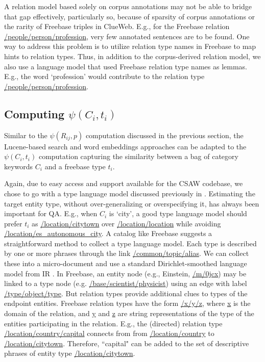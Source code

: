 \documentclass[a4paper, twoside, 12pt]{report}
\begin{document}
A relation model based solely on corpus annotations may not be able to bridge that gap effectively, particularly so, because of sparsity of corpus annotations or the rarity of Freebase triples in ClueWeb. E.g., for the Freebase relation \url{/people/person/profession}, very few annotated sentences are to be found.  One way
to address this problem is to utilize relation type
names in Freebase to map hints to relation types.
Thus, in addition to the corpus-derived relation
model, we also use a language model that used
Freebase relation type names as lemmas. E.g., the
word `profession' would contribute to the relation
type \url{/people/person/profession}.


\subsection{Computing $\psi(C_i, t_i)$}
Similar to the $\psi(R_{ij},p)$ computation discussed in the previous section, the Lucene-based search and word embeddings approaches can be adapted to the $\psi(C_i, t_i)$ computation capturing the similarity between a bag of category keywords $C_i$ and a freebase type $t_i$.

Again, due to easy access and support available for the CSAW codebase, we chose to go with a type language model discussed previously in \cite{joshiknowledge}. 
Estimating the target entity type, without over-generalizing or overspecifying it, has always been important for QA. E.g., when $C_i$ is `city', a good type language model should prefer $t_i$ as \url{/location/citytown} over \url{/location/location} while avoiding \url{/location/es_autonomous_city}.
A catalog like Freebase suggests a straightforward method to collect a type language model. Each type is described by one or more phrases through the link \url{/common/topic/alias}. We
can collect these into a micro-document and use a standard Dirichlet-smoothed language model from IR \cite{zhai2008statistical}. In Freebase, an entity node (e.g., Einstein, \url{/m/0jcx}) may be linked to a type node (e.g. \url{/base/scientist/physicist}) using an edge with label \url{/type/object/type}. But relation types provide additional clues to types of the endpoint entities. Freebase relation types have the form \url{/x/y/z}, where \url{x} is the domain of the relation, and \url{y} and \url{z} are string representations of the type of the entities participating in the relation. E.g., the (directed) relation
type \url{/location/country/capital} connects from from \url{/location/country} to \url{/location/citytown}. Therefore, ``capital" can be added to the set of descriptive phrases of entity type \url{/location/citytown}. 
\end{document}
